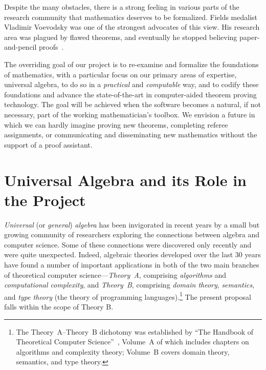 \documentclass[11pt]{amsart}  %
\begin{document}
  Despite the many obstacles, there is a strong
  feeling in various parts of the research community that mathematics deserves to
  be formalized. Fields medalist Vladimir Voevodsky was one of
  the strongest advocates of this view. His research area was plagued by flawed theorems, and eventually he stopped believing paper-and-pencil proofs~\cite{rehmeyer:2013}.


The overriding goal of our project is to re-examine and formalize the foundations of 
mathematics, with a particular focus on our primary areas of expertise, universal algebra, to do so in a \emph{practical} and \emph{computable} way, and to codify these foundations and advance the state-of-the-art in computer-aided theorem proving technology. The goal will be achieved when the software becomes a natural, if not necessary, part of the working mathematician's toolbox.  We envision a future in which we can hardly imagine proving new theorems, completing referee assignments, or communicating and disseminating new mathematics without the support of a proof assistant.


\section{Universal Algebra and its Role in the Project}
\emph{Universal} (or \emph{general}) \emph{algebra} has been invigorated in recent years by a small but growing community of researchers exploring the connections between algebra and computer science. Some of these connections were discovered only recently and were quite unexpected. Indeed, algebraic theories developed over the last 30 years have found a number of important applications in both of the two main branches of theoretical computer science---\emph{Theory~A}, comprising \emph{algorithms} and \emph{computational complexity}, and \emph{Theory~B}, comprising \emph{domain theory}, \emph{semantics}, and \emph{type theory} (the theory of programming languages).\footnote{The Theory~A--Theory~B dichotomy was established by ``The Handbook of Theoretical Computer Science''~\cite{vanLeeuwen:1991A,vanLeeuwen:1991B}, Volume~A of which includes chapters on algorithms and complexity theory; Volume~B covers domain theory, semantics, and type theory.}
The present proposal falls within the scope of Theory B.
\end{document}
